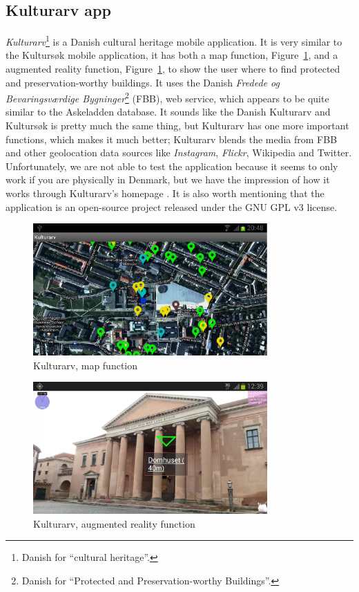 \documentclass[11pt]{book}
\begin{document}
\subsection{Kulturarv app}
\emph{Kulturarv}\footnote{Danish for ``cultural heritage''.} is a Danish cultural heritage mobile application. It is very similar to the Kultursøk mobile application, it has both a map function, Figure~\ref{fig:pre_kulturArvAppMap}, and a augmented reality function, Figure~\ref{fig:pre_kulturArvAppMap},  to show the user where to find protected and preservation-worthy buildings. It uses the Danish \emph{Fredede og Bevaringsværdige Bygninger}\footnote{Danish for ``Protected and Preservation-worthy Buildings''.} (FBB), web service, which appears to be quite similar to the Askeladden database. It sounds like the Danish Kulturarv and Kultursøk is pretty much the same thing, but Kulturarv has one more important functions, which makes it much better; Kulturarv blends the media from FBB and other geolocation data sources like \emph{Instagram}, \emph{Flickr}, Wikipedia and Twitter. Unfortunately, we are not able to test the application because it seems to only work if you are physically in Denmark, but we have the impression of how it works through Kulturarv's homepage \cite{Kulturarv}. It is also worth  mentioning that the application is an open-source project released under the GNU GPL v3 license.

\begin{figure}[H]
      \centering
      \includegraphics[width=0.8\textwidth]{Figures/Prestudy/kulturArvMap.png}
      \caption{Kulturarv, map function}
      \label{fig:pre_kulturArvAppMap}
\end{figure}

\begin{figure}[H]
      \centering
      \includegraphics[width=0.8\textwidth]{Figures/Prestudy/kulturArvAR1.png}
      \caption{Kulturarv, augmented reality function}
      \label{fig:pre_kulturArvAppAug}
\end{figure}
\end{document}
